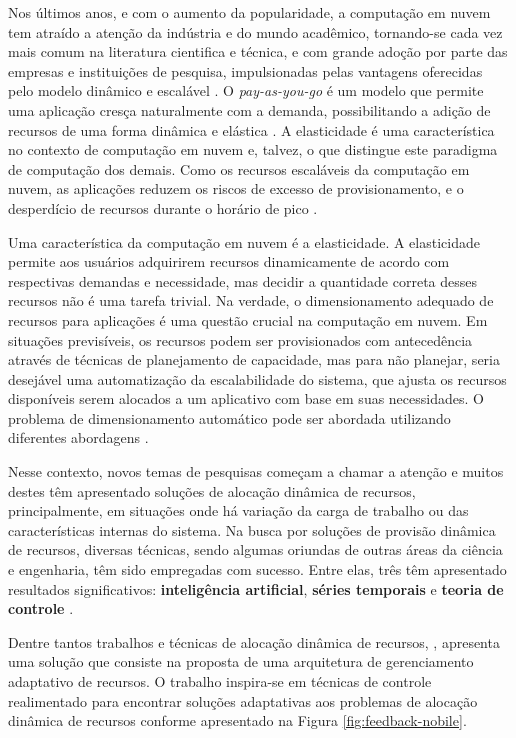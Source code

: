 Nos últimos anos, e com o aumento da popularidade, a computação em nuvem tem atraído a atenção da indústria e do mundo acadêmico, tornando-se cada vez mais comum na literatura cientifica e técnica, e com grande adoção por parte das empresas e instituições de pesquisa, impulsionadas pelas vantagens oferecidas pelo modelo dinâmico e escalável . O \textit{pay-as-you-go} é um modelo que permite uma aplicação cresça naturalmente com a demanda, possibilitando a adição de recursos de uma forma dinâmica e elástica \cite{vazquez2014}. 
A elasticidade é uma característica  no contexto de computação em nuvem e, talvez, o que distingue este paradigma de computação dos demais. Como os recursos escaláveis da computação em nuvem, as aplicações reduzem os riscos de excesso de provisionamento, e o desperdício de recursos durante o horário de pico \cite{vazquez2014, galante2012}.

Uma característica da computação em nuvem é a elasticidade. A elasticidade permite aos usuários adquirirem recursos dinamicamente de acordo com respectivas demandas e necessidade, mas decidir a quantidade correta desses recursos não é uma tarefa trivial. Na verdade, o dimensionamento adequado de recursos para aplicações é uma questão crucial na computação em nuvem. Em situações previsíveis, os recursos podem ser provisionados com antecedência através de técnicas de planejamento de capacidade, mas para não planejar, seria desejável uma automatização da escalabilidade do sistema, que ajusta os recursos disponíveis serem alocados a um aplicativo com base em suas necessidades. O problema de dimensionamento automático pode ser abordada utilizando diferentes abordagens \cite{Tania2012}.  

Nesse contexto, novos temas de pesquisas começam a chamar a atenção e muitos destes têm apresentado soluções de alocação dinâmica de recursos, principalmente, em situações onde há variação da carga de trabalho ou das características internas do sistema. 
Na busca por soluções de provisão dinâmica de recursos, diversas técnicas, sendo algumas oriundas de outras áreas da ciência e engenharia, têm sido empregadas com sucesso. Entre elas, três têm apresentado resultados significativos: \textbf{inteligência artificial}, \textbf{séries temporais} e \textbf{teoria de controle} \cite{Nobile2013}.

Dentre tantos trabalhos e técnicas de alocação dinâmica de recursos, , apresenta uma solução que consiste na proposta de uma arquitetura de gerenciamento adaptativo de recursos. O trabalho inspira-se em técnicas de controle realimentado para encontrar soluções adaptativas aos problemas de alocação dinâmica de recursos conforme apresentado na Figura \ref{fig:feedback-nobile}.

